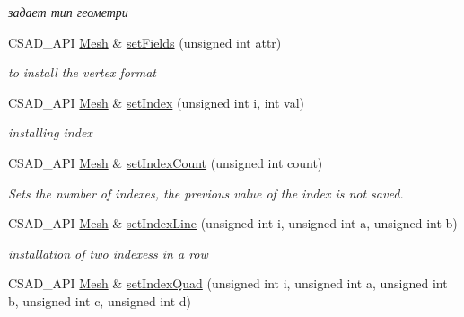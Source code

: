 \begin{DoxyCompactItemize}
\begin{DoxyCompactList}\small\item\em задает тип геометри \end{DoxyCompactList}\item 
\hypertarget{classcsad_1_1_mesh_afba476289c0dc2a0e3c382cc1eceba99}{C\-S\-A\-D\-\_\-\-A\-P\-I \hyperlink{classcsad_1_1_mesh}{Mesh} \& \hyperlink{classcsad_1_1_mesh_afba476289c0dc2a0e3c382cc1eceba99}{set\-Fields} (unsigned int attr)}\label{classcsad_1_1_mesh_afba476289c0dc2a0e3c382cc1eceba99}

\begin{DoxyCompactList}\small\item\em to install the vertex format \end{DoxyCompactList}\item 
\hypertarget{classcsad_1_1_mesh_a728eb98e02ca5cf2eb122ef63aca4c95}{C\-S\-A\-D\-\_\-\-A\-P\-I \hyperlink{classcsad_1_1_mesh}{Mesh} \& \hyperlink{classcsad_1_1_mesh_a728eb98e02ca5cf2eb122ef63aca4c95}{set\-Index} (unsigned int i, int val)}\label{classcsad_1_1_mesh_a728eb98e02ca5cf2eb122ef63aca4c95}

\begin{DoxyCompactList}\small\item\em installing index \end{DoxyCompactList}\item 
\hypertarget{classcsad_1_1_mesh_a87c8755460e51fce2b7fcd544c17e07f}{C\-S\-A\-D\-\_\-\-A\-P\-I \hyperlink{classcsad_1_1_mesh}{Mesh} \& \hyperlink{classcsad_1_1_mesh_a87c8755460e51fce2b7fcd544c17e07f}{set\-Index\-Count} (unsigned int count)}\label{classcsad_1_1_mesh_a87c8755460e51fce2b7fcd544c17e07f}

\begin{DoxyCompactList}\small\item\em Sets the number of indexes, the previous value of the index is not saved. \end{DoxyCompactList}\item 
\hypertarget{classcsad_1_1_mesh_a40e58b4af7cf86102765ada030b0b647}{C\-S\-A\-D\-\_\-\-A\-P\-I \hyperlink{classcsad_1_1_mesh}{Mesh} \& \hyperlink{classcsad_1_1_mesh_a40e58b4af7cf86102765ada030b0b647}{set\-Index\-Line} (unsigned int i, unsigned int a, unsigned int b)}\label{classcsad_1_1_mesh_a40e58b4af7cf86102765ada030b0b647}

\begin{DoxyCompactList}\small\item\em installation of two indexess in a row \end{DoxyCompactList}\item 
\hypertarget{classcsad_1_1_mesh_a6964f6d0e3a982a210741bdc8b415346}{C\-S\-A\-D\-\_\-\-A\-P\-I \hyperlink{classcsad_1_1_mesh}{Mesh} \& \hyperlink{classcsad_1_1_mesh_a6964f6d0e3a982a210741bdc8b415346}{set\-Index\-Quad} (unsigned int i, unsigned int a, unsigned int b, unsigned int c, unsigned int d)}\label{classcsad_1_1_mesh_a6964f6d0e3a982a210741bdc8b415346}


\end{DoxyCompactItemize}
